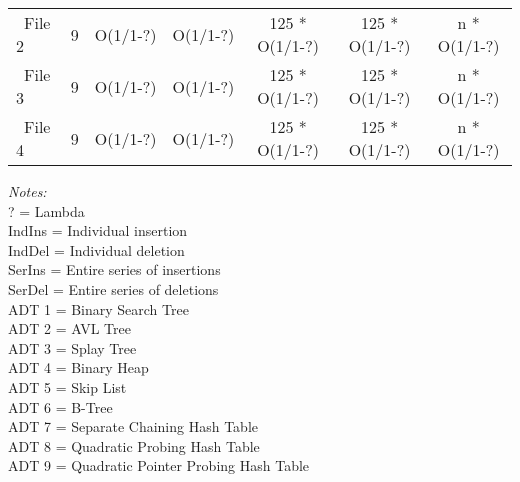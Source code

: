 \documentclass[8]{report}
\begin{document}
\begin{table}[ht]
\begin{adjustbox}{width=1.35\textwidth}
\begin{threeparttable}
\begin{tabular}{l*{6}{c}}
\ File 2 	&      9     &      O(1/1-?)    &  O(1/1-?)  	&    125 * O(1/1-?)    &    125 * O(1/1-?)     & n * O(1/1-?)   \\
                  
\ File 3 	&      9     &      O(1/1-?)    &  O(1/1-?) 	&    125 * O(1/1-?)   &    125 * O(1/1-?)     & n * O(1/1-?)   \\
 \ File 4 	&      9     &      O(1/1-?)   &  O(1/1-?) 	&    125 * O(1/1-?)   &    125 * O(1/1-?)     & n * O(1/1-?)  \\


                                                        


\hline 

\end{tabular}


\begin{tablenotes} 
\setlength{}
\footnotesize
\item \textit{Notes:} \\
 ? = Lambda \\
 IndIns = Individual insertion  \\			
IndDel = Individual deletion    \\			 
SerIns =  Entire series of insertions\\		
SerDel = Entire series of deletions\\		
	ADT 1 = Binary Search Tree\\		
	ADT 2 = AVL Tree\\
	ADT 3 = Splay Tree\\
	ADT 4 = Binary Heap\\					
	ADT  5 = Skip List\\							
ADT 6 = B-Tree \\
ADT 7 =  Separate Chaining Hash Table \\
ADT 8 =  Quadratic Probing Hash Table \\
ADT 9 = Quadratic Pointer Probing Hash Table\\


\end{tablenotes}
\end{threeparttable}
\end{adjustbox}
\end{table}
\end{document}
